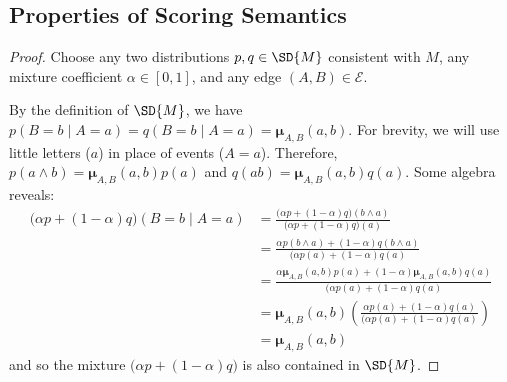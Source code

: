 \documentclass{article}
\theoremstyle{plain}
\theoremstyle{definition}
\theoremstyle{remark}
\newcommand{\bmu}{\boldsymbol{\mu}}
\newcommand{\Ed}{\mathcal E}
\numberwithin{equation}{section}
\begin{document}
	\subsection{Properties of Scoring Semantics}
	\begin{vfull}
		\thmsetconvex*
		\begin{proof}
			Choose any two distributions $p, q \in \SD{M}$ consistent with $M$, any mixture coefficient $\alpha \in [0,1]$, and any edge $(A,B) \in \Ed$.
			
			By the definition of $\SD{M}$, we have $p(B = b \mid A = a) = q(B = b \mid A = a) = \bmu_{A,B}(a,b)$.  
			For brevity, we will use little letters ($a$) in place of events ($A = a$).
			Therefore, $p(a\land b) = \bmu_{A,B}(a,b) p(a)$ and $q(ab) = \bmu_{A,B}(a,b) q(a)$. Some algebra reveals:
			\begin{align*}
				\Big( \alpha p + (1-\alpha) q \Big) (B = b \mid A = a) &= 
				\frac{\Big( \alpha p + (1-\alpha) q \Big) (b \land a)}{\Big( \alpha p + (1-\alpha) q \Big) (a)} \\
				&= \frac{ \alpha p(b \land a) + (1-\alpha) q(b \land a) }{\Big( \alpha p(a) + (1-\alpha) q (a)} \\
				&= \frac{ \alpha \bmu_{A,B}(a,b) p(a) + (1-\alpha) \bmu_{A,B}(a,b) q(a) }{\Big( \alpha p(a) + (1-\alpha) q (a)} \\
				&=\bmu_{A,B}(a,b) \left(\frac{ \alpha  p(a) + (1-\alpha) q(a) }{\Big( \alpha p(a) + (1-\alpha) q (a)}\right)\\
				&= \bmu_{A,B}(a,b)
			\end{align*}
			and so the mixture $\Big(\alpha p + (1-\alpha) q \Big)$ is also contained in $\SD{M}$.
		\end{proof}
\end{vfull}
		
\end{document}
